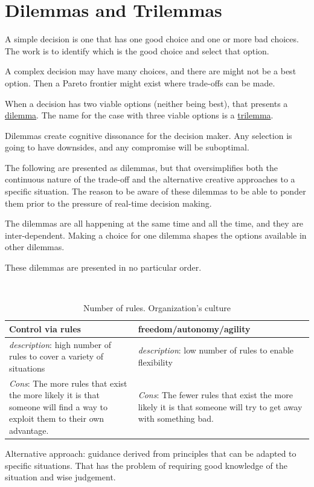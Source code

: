 \section{Dilemmas and Trilemmas\label{sec:dilemma_trilemma}}

A simple decision is one that has one good choice and one or more bad choices. The work is to identify which is the good choice and select that option.

A complex decision may have many choices, and there are might not be a best option. Then a Pareto frontier might exist where trade-offs can be made. 

When a decision has two viable options (neither being best), that presents a \href{https://en.wikipedia.org/wiki/Dilemma}{dilemma}. The name for the case with three viable options is a \href{https://en.wikipedia.org/wiki/Trilemma}{trilemma}.

Dilemmas create cognitive dissonance for the decision maker. Any selection is going to have downsides, and any compromise will be suboptimal. 

The following are presented as dilemmas, but that oversimplifies both the continuous nature of the trade-off and the alternative creative approaches to a specific situation. The reason to be aware of these dilemmas to be able to ponder them prior to the pressure of real-time decision making. 

The dilemmas are all happening at the same time and all the time, and they are inter-dependent. Making a choice for one dilemma shapes the options available in other dilemmas.

These dilemmas are presented in no particular order. 

\ \\

\begin{center}
\begin{table}[ht]
\begin{tabular}{ | m{\dilemmatablewidth}| m{\dilemmatablewidth} | } 
  \hline
  \textbf{Control via rules} & \textbf{freedom/autonomy/agility} \\ 
  \hline
  \textit{description}: high number of rules to cover a variety of situations & 
  \textit{description}: low number of rules to enable flexibility \\ 
  \hline
  \textit{Cons}: The more rules that exist the more likely it is that someone will find a way to exploit them to their own advantage. & 
  \textit{Cons}: The fewer rules that exist the more likely it is that someone will try to get away with something bad. \\  
  \hline
\end{tabular}
\caption{Number of rules.
{\tiny Organization's culture}
}
\end{table}
\end{center}
Alternative approach: guidance derived from principles that can be adapted to specific situations. That has the problem of requiring good knowledge of the situation and wise judgement.



